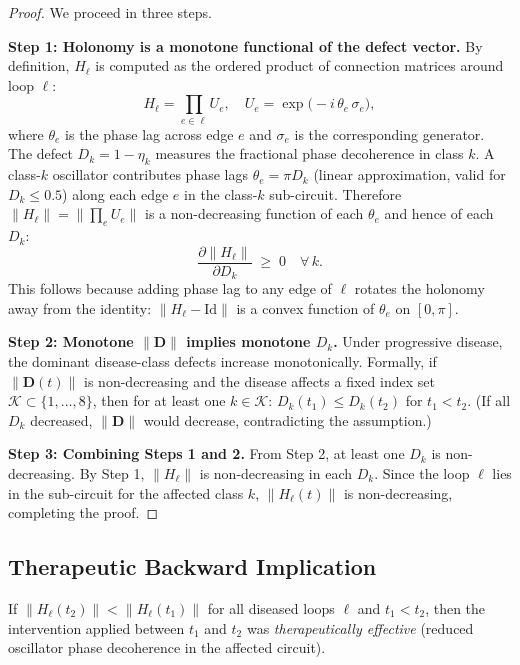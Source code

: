 \begin{proof}
We proceed in three steps.

\textbf{Step 1: Holonomy is a monotone functional of the defect vector.}
By definition, $H_\ell$ is computed as the ordered product of connection
matrices around loop $\ell$:
\begin{equation}
    H_\ell = \prod_{e \in \ell} U_e,
    \quad U_e = \exp\!\bigl(-i\,\theta_e\,\sigma_e\bigr),
\end{equation}
where $\theta_e$ is the phase lag across edge $e$ and $\sigma_e$ is the
corresponding generator.  The defect $D_k = 1 - \eta_k$ measures the
fractional phase decoherence in class $k$.  A class-$k$ oscillator
contributes phase lags $\theta_e = \pi D_k$ (linear approximation, valid
for $D_k \leq 0.5$) along each edge $e$ in the class-$k$ sub-circuit.
Therefore $\|H_\ell\| = \|{\prod_e U_e}\|$ is a non-decreasing function
of each $\theta_e$ and hence of each $D_k$:
\begin{equation}
    \frac{\partial \|H_\ell\|}{\partial D_k} \;\geq\; 0
    \quad \forall\, k.
\end{equation}
This follows because adding phase lag to any edge of $\ell$ rotates the
holonomy away from the identity: $\|H_\ell - \mathrm{Id}\|$ is a convex
function of $\theta_e$ on $[0,\pi]$.

\textbf{Step 2: Monotone $\|\mathbf{D}\|$ implies monotone $D_k$.}
Under progressive disease, the dominant disease-class defects increase
monotonically.  Formally, if $\|\mathbf{D}(t)\|$ is non-decreasing and the
disease affects a fixed index set $\mathcal{K} \subset \{1,\ldots,8\}$, then
for at least one $k \in \mathcal{K}$: $D_k(t_1) \leq D_k(t_2)$ for
$t_1 < t_2$.  (If all $D_k$ decreased, $\|\mathbf{D}\|$ would decrease,
contradicting the assumption.)

\textbf{Step 3: Combining Steps 1 and 2.}
From Step 2, at least one $D_k$ is non-decreasing.  By Step 1,
$\|H_\ell\|$ is non-decreasing in each $D_k$.  Since the loop $\ell$
lies in the sub-circuit for the affected class $k$, $\|H_\ell(t)\|$ is
non-decreasing, completing the proof.
\end{proof}

\subsection{Therapeutic Backward Implication}

\begin{theorem}
\label{thm:ch04-therapeutic-detection}
If $\|H_\ell(t_2)\| < \|H_\ell(t_1)\|$ for all diseased loops $\ell$ and
$t_1 < t_2$, then the intervention applied between $t_1$ and $t_2$ was
\emph{therapeutically effective} (reduced oscillator phase decoherence in
the affected circuit).
\end{theorem}

